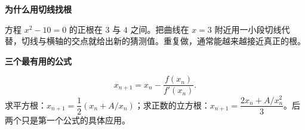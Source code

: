 \clearpage
\begin{statementbox}
\textbf{\textcolor{CStatement}{为什么用切线找根}}
\par\medskip
\begin{center}

\end{center}
\medskip
方程 $x^2-10=0$ 的正根在 $3$ 与 $4$ 之间。把曲线在 $x=3$ 附近用一小段切线代替，切线与横轴的交点就给出新的猜测值。重复做，通常能越来越接近真正的根。
\end{statementbox}
\clearpage
\begin{statementbox}
\textbf{\textcolor{CStatement}{三个最有用的公式}}
\par\medskip
\begin{center}

\end{center}
\medskip
\[x_{n+1}=x_n-\frac{f(x_n)}{f'(x_n)}.\]求平方根：$x_{n+1}=\dfrac12(x_n+A/x_n)$；求正数的立方根：$x_{n+1}=\dfrac{2x_n+A/x_n^2}{3}$。后两个只是第一个公式的具体应用。
\end{statementbox}

